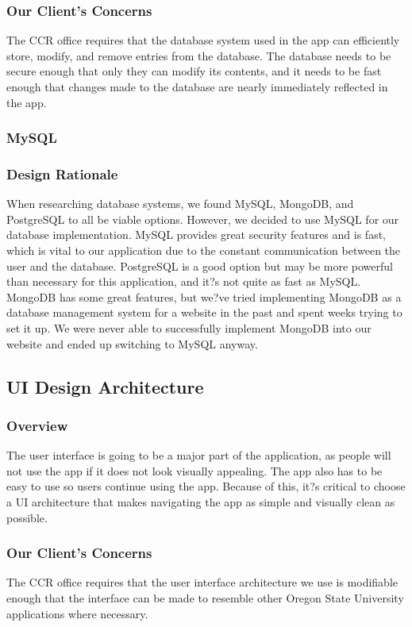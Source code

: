 \documentclass[draftclsnofoot, onecolumn, 10pt, compsoc]{IEEEtran}
\begin{document}
			\subsubsection{Our Client's Concerns}
				The CCR office requires that the database system used in the app can efficiently store, modify, and remove entries from the database. The database needs to be secure enough that only they can modify its contents, and it needs to be fast enough that changes made to the database are nearly immediately reflected in the app.
			\subsubsection{MySQL}
			\subsubsection{Design Rationale}
				When researching database systems, we found MySQL, MongoDB, and PostgreSQL to all be viable options. However, we decided to use MySQL for our database implementation. MySQL provides great security features and is fast, which is vital to our application due to the constant communication between the user and the database. PostgreSQL is a good option but may be more powerful than necessary for this application, and it?s not quite as fast as MySQL. MongoDB has some great features, but we?ve tried implementing MongoDB as a database management system for a website in the past and spent weeks trying to set it up. We were never able to successfully implement MongoDB into our website and ended up switching to MySQL anyway.

		\subsection{UI Design Architecture}
			\subsubsection{Overview}
				The user interface is going to be a major part of the application, as people will not use the app if it does not look visually appealing. The app also has to be easy to use so users continue using the app. Because of this, it?s critical to choose a UI architecture that makes navigating the app as simple and visually clean as possible.
			\subsubsection{Our Client's Concerns}
				The CCR office requires that the user interface architecture we use is modifiable enough that the interface can be made to resemble other Oregon State University applications where necessary.
\end{document}

